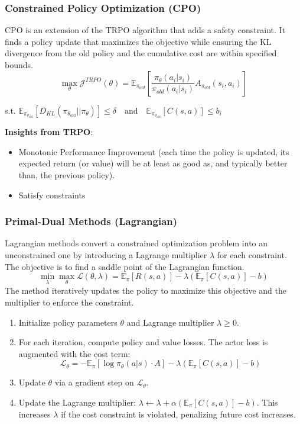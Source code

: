 \documentclass[12pt]{article}
\begin{document}
\subsubsection{Constrained Policy Optimization (CPO)}
CPO is an extension of the TRPO algorithm that adds a safety constraint. It finds a policy update that maximizes the objective while ensuring the KL divergence from the old policy and the cumulative cost are within specified bounds.
$$
\max_{\theta} \mathcal{J}^{TRPO}(\theta) = \mathbb{E}_{\pi_{old}}\left[ \frac{\pi_{\theta}(a_i|s_i)}{\pi_{old}(a_i|s_i)}A_{\pi_{old}}(s_i, a_i) \right] 
$$
\begin{center}
s.t. $\mathbb{E}_{\pi_{\theta_{\text{old}}}} [D_{KL}(\pi_{\theta_{\text{old}}} || \pi_\theta)] \leq \delta \quad \text{and} \quad \mathbb{E}_{\pi_{\theta_{\text{old}}}} [C(s, a)] \leq b_i$
\end{center}

\textbf{Insights from TRPO}:
\begin{itemize}
    \item Monotonic Performance Improvement (each time the policy is updated, its expected return (or value) will be at least as good as, and typically better than, the previous policy).
    \item Satisfy constraints
\end{itemize}
\subsubsection{Primal-Dual Methods (Lagrangian)}
Lagrangian methods convert a constrained optimization problem into an unconstrained one by introducing a Lagrange multiplier $\lambda$ for each constraint. The objective is to find a saddle point of the Lagrangian function.
$$ \min_\lambda \max_\theta \mathcal{L}(\theta, \lambda) = \mathbb{E}_\pi [R(s, a)] - \lambda \left( \mathbb{E}_\pi [C(s, a)] - b \right) $$
The method iteratively updates the policy to maximize this objective and the multiplier to enforce the constraint.
\begin{enumerate}
    \item Initialize policy parameters $\theta$ and Lagrange multiplier $\lambda \ge 0$.
    \item For each iteration, compute policy and value losses. The actor loss is augmented with the cost term:
    $$ \mathcal{L}_\theta = - \mathbb{E}_\pi [\log \pi_\theta(a|s) \cdot A] - \lambda \left( \mathbb{E}_\pi [C(s, a)] - b \right) $$
    \item Update $\theta$ via a gradient step on $\mathcal{L}_\theta$.
    \item Update the Lagrange multiplier: $\lambda \leftarrow \lambda + \alpha \left( \mathbb{E}_\pi [C(s, a)] - b \right)$. This increases $\lambda$ if the cost constraint is violated, penalizing future cost increases.
\end{enumerate}
\end{document}
